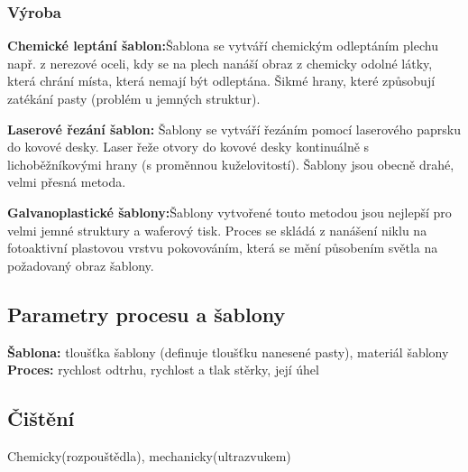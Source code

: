 \subsubsection{Výroba}
\textbf{Chemické leptání šablon:}Šablona se vytváří chemickým odleptáním plechu např. z nerezové oceli, kdy se na plech nanáší obraz z chemicky odolné látky, která
chrání místa, která nemají být odleptána. Šikmé hrany, které způsobují zatékání pasty (problém u jemných struktur).

\textbf{Laserové řezání šablon:} Šablony se vytváří řezáním pomocí laserového paprsku do kovové desky. Laser řeže otvory do kovové desky kontinuálně s lichoběžníkovými hrany
(s proměnnou kuželovitostí). Šablony jsou obecně drahé, velmi přesná metoda.

\textbf{Galvanoplastické šablony:}Šablony vytvořené touto metodou jsou nejlepší pro velmi jemné struktury a waferový tisk. Proces se skládá z nanášení niklu na fotoaktivní plastovou vrstvu pokovováním, která se mění působením světla na požadovaný obraz šablony.


\subsection{Parametry procesu a šablony}
\textbf{Šablona:} tloušťka šablony (definuje tloušťku nanesené pasty), materiál šablony\\
\textbf{Proces:} rychlost odtrhu, rychlost a tlak stěrky, její úhel

\subsection{Čištění}
Chemicky(rozpouštědla), mechanicky(ultrazvukem)